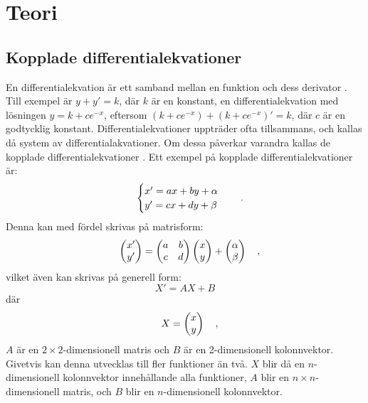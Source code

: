 \section{Teori}
\subsection{Kopplade differentialekvationer}
En differentialekvation är ett samband mellan en funktion och dess derivator \parencite{noauthor_differentialekvation_nodate}. Till exempel är \(y+y'=k\), där \(k\) är en konstant, en differentialekvation med lösningen \(y=k+ce^{-x}\), eftersom \((k+ce^{-x})+(k+ce^{-x})'=k\), där \(c\) är en godtycklig konstant. Differentialekvationer uppträder ofta tillsammans, och kallas då system av differentialakvationer. Om dessa påverkar varandra kallas de kopplade differentialekvationer \parencite{cheever_representing_nodate}.
Ett exempel på kopplade differentialekvationer är:
\begin{equation}\label{eq:simple_sys_of_diffeq}
    \begin{cases}
        x'=ax+by+\alpha\\
        y'=cx+dy+\beta
    \end{cases}
\quad\mathrm{.}\!\!\!\!\!\!\end{equation} Denna kan med fördel skrivas på matrisform:
\begin{equation}
    \begin{pmatrix}x'\\y'\end{pmatrix}
    =
    \begin{pmatrix}
        a & b\\
        c & d
    \end{pmatrix}
    \begin{pmatrix}x\\y\end{pmatrix}+\begin{pmatrix}\alpha\\\beta\end{pmatrix}
\quad\mathrm{,}\!\!\!\!\!\!\end{equation} vilket även kan skrivas på generell form:
\begin{equation}\label{eq:coupled_ode_matrix_form}
    X'=AX+B
\end{equation} där
\begin{equation*}
    X=\begin{pmatrix}x\\y\end{pmatrix}
\quad\mathrm{,}\!\!\!\!\!\!\end{equation*} \(A\) är en \(2\times 2\)-dimensionell matris och \(B\) är en 2-dimensionell kolonnvektor. Givetvis kan denna utvecklas till fler funktioner än två. \(X\) blir då en \(n\)-dimensionell kolonnvektor innehållande alla funktioner, \(A\) blir en \(n\times n\)-dimensionell matris, och \(B\) blir en \(n\)-dimensionell kolonnvektor.

